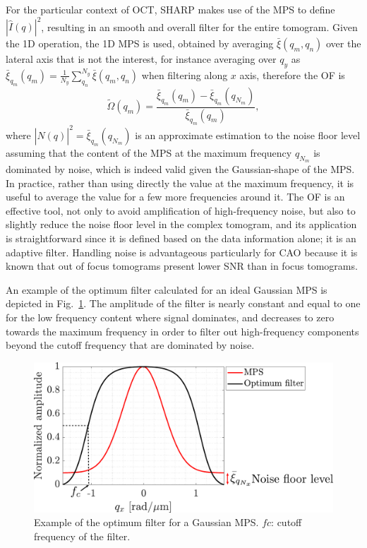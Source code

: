 For the particular context of OCT, SHARP makes use of the MPS to define $|\hat{I}(q)|^2$, resulting in an smooth and overall filter for the entire tomogram. Given the 1D operation, the 1D MPS is used, obtained by averaging $\bar{\xi}(q_m,q_n)$ over the lateral axis that is not the interest, for instance averaging over $q_y$ as $\bar{\xi}_{q_m}(q_m) = \frac{1}{N_y}\sum_{q_n}^{N_y}\bar{\xi}(q_m,q_n)$ when filtering along $x$ axis, therefore the OF is
\begin{equation}
    \tilde{\Omega}(q_m) = \frac{\bar{\xi}_{q_m}(q_m) - \bar{\xi}_{q_m}(q_{N_m})}{\bar{\xi}_{q_m}(q_m)},
\end{equation}
where $|\hat{N}(q)|^2 = \bar{\xi}_{q_m}(q_{N_m})$ is an approximate estimation to the noise floor level assuming that the content of the MPS at the maximum frequency $q_{N_m}$ is dominated by noise, which is indeed valid given the Gaussian-shape of the MPS. In practice, rather than using directly the value at the maximum frequency, it is useful to average the value for a few more frequencies around it. The OF is an effective tool, not only to avoid amplification of high-frequency noise, but also to slightly reduce the noise floor level in the complex tomogram, and its application is straightforward since it is defined based on the data information alone; it is an adaptive filter. Handling noise is advantageous particularly for CAO because it is known that out of focus tomograms present lower SNR than in focus tomograms. 

An example of the optimum filter calculated for an ideal Gaussian MPS is depicted in Fig.~\ref{fig:OptimumFilter}. The amplitude of the filter is nearly constant and equal to one for the low frequency content where signal dominates, and decreases to zero towards the maximum frequency in order to filter out high-frequency components beyond the cutoff frequency that are dominated by noise.

\begin{figure}[htb!]
	\centering
	\includegraphics[width=.7\textwidth]{Figures/SHARP/OptimumFilterExample.pdf}
	\caption[Example of the optimum filter for a Gaussian MPS.]{Example of the optimum filter for a Gaussian MPS. $fc$: cutoff frequency of the filter.}
	\label{fig:OptimumFilter}
\end{figure}

